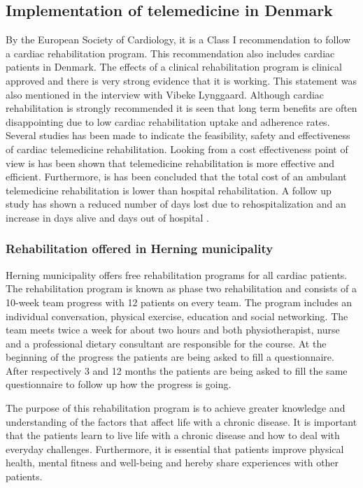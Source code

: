 \subsection{Implementation of telemedicine in Denmark}
By the European Society of Cardiology, it is a Class I recommendation to follow a cardiac rehabilitation program. This recommendation also includes cardiac patients in Denmark. The effects of a clinical rehabilitation program is clinical approved and there is very strong evidence that it is working. This statement was also mentioned in the interview with Vibeke Lynggaard. Although cardiac rehabilitation is strongly recommended it is seen that long term benefits are often disappointing due to low cardiac rehabilitation uptake and adherence rates.  Several studies has been made to indicate the feasibility, safety and effectiveness of cardiac telemedicine rehabilitation. Looking from a cost effectiveness point of view is has been shown that telemedicine rehabilitation is more effective and efficient. Furthermore, is has been concluded that the total cost of an ambulant telemedicine rehabilitation is lower than hospital rehabilitation. A follow up study has shown a reduced number of days lost due to rehospitalization and an increase in days alive and days out of hospital \cite{costeffect}. 

\subsubsection{Rehabilitation offered in Herning municipality} 

Herning municipality offers free rehabilitation programs for all cardiac patients. The rehabilitation program is known as phase two rehabilitation and consists of a 10-week team progress with 12 patients on every team. The program includes an individual conversation, physical exercise, education and social networking. The team meets twice a week for about two hours and both physiotherapist, nurse and a professional dietary consultant are responsible for the course. At the beginning of the progress the patients are being asked to fill a questionnaire. After respectively 3 and 12 months the patients are being asked to fill the same questionnaire to follow up how the progress is going. 

The purpose of this rehabilitation program is to achieve greater knowledge and understanding of the factors that affect life with a chronic disease. It is important that the patients learn to live life with a chronic disease and how to deal with everyday challenges. Furthermore, it is essential that patients improve physical health, mental fitness and well-being and hereby share experiences with other patients. 


